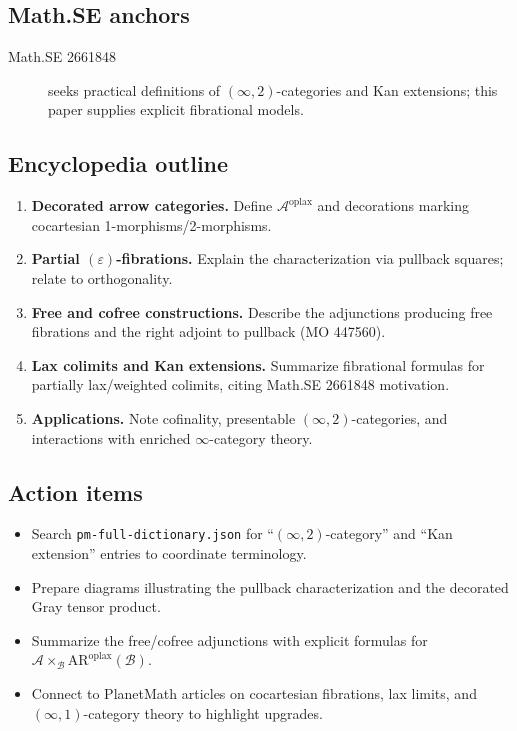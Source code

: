 \subsection*{Math.SE anchors}
\begin{description}
  \item[Math.SE 2661848] seeks practical definitions of $(\infty,2)$-categories and Kan extensions; this paper supplies explicit fibrational models.
\end{description}
\subsection*{Encyclopedia outline}
\begin{enumerate}
  \item \textbf{Decorated arrow categories.} Define $\mathcal{A}^\mathrm{oplax}$ and decorations marking cocartesian 1-morphisms/2-morphisms.
  \item \textbf{Partial $(\varepsilon)$-fibrations.} Explain the characterization via pullback squares; relate to orthogonality.
  \item \textbf{Free and cofree constructions.} Describe the adjunctions producing free fibrations and the right adjoint to pullback (MO 447560).
  \item \textbf{Lax colimits and Kan extensions.} Summarize fibrational formulas for partially lax/weighted colimits, citing Math.SE 2661848 motivation.
  \item \textbf{Applications.} Note cofinality, presentable $(\infty,2)$-categories, and interactions with enriched $\infty$-category theory.
\end{enumerate}
\subsection*{Action items}
\begin{itemize}
  \item Search \texttt{pm-full-dictionary.json} for ``$(\infty,2)$-category'' and ``Kan extension'' entries to coordinate terminology.
  \item Prepare diagrams illustrating the pullback characterization and the decorated Gray tensor product.
  \item Summarize the free/cofree adjunctions with explicit formulas for $\mathcal{A} \times_{\mathcal{B}} \mathrm{AR}^{\mathrm{oplax}}(\mathcal{B})$.
  \item Connect to PlanetMath articles on cocartesian fibrations, lax limits, and $(\infty,1)$-category theory to highlight upgrades.
\end{itemize}
